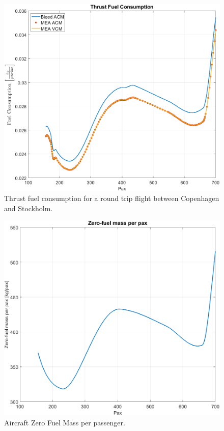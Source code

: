 \documentclass[english]{kththesis}
\begin{document}
\begin{figure}[!ht]
    \centering
    \includegraphics[width=1\textwidth]{Epictures/ThrustFuelCon.png}
    \caption{Thrust fuel consumption for a round trip flight between Copenhagen and Stockholm.}
    \label{fig:ThrustFuelCon}
\end{figure}

\begin{figure}[!ht]
    \centering
    \includegraphics[width=1\textwidth]{Epictures/ZFMppax.png}
    \caption{Aircraft Zero Fuel Mass per passenger.}
    \label{fig:ZFMppax}
\end{figure}
\end{document}
